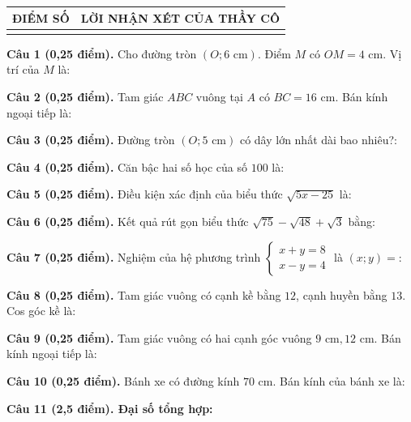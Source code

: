 \documentclass[12pt,a4paper]{article}
\begin{document}
\vspace{1.0mm}

\noindent
\begin{tabularx}{\linewidth}{|p{3.2cm}|X|}
\hline
\centering\textbf{ĐIỂM SỐ} & \centering\textbf{LỜI NHẬN XÉT CỦA THẦY CÔ} \tabularnewline
\hline
\rule{0pt}{1.8cm} & \tabularnewline
\hline
\end{tabularx}

\vspace{1.2mm}
\noindent\textbf{Câu 1 (0,25 điểm).} Cho đường tròn $(O; 6\text{ cm})$. Điểm $M$ có $OM = 4\text{ cm}$. Vị trí của $M$ là: \par\vspace{0.6mm}
\noindent\textbf{Câu 2 (0,25 điểm).} Tam giác $ABC$ vuông tại $A$ có $BC = 16\text{ cm}$. Bán kính ngoại tiếp là: \par\vspace{0.6mm}
\noindent\textbf{Câu 3 (0,25 điểm).} Đường tròn $(O; 5\text{ cm})$ có dây lớn nhất dài bao nhiêu?: \par\vspace{0.6mm}
\noindent\textbf{Câu 4 (0,25 điểm).} Căn bậc hai số học của số $100$ là: \par\vspace{0.6mm}
\noindent\textbf{Câu 5 (0,25 điểm).} Điều kiện xác định của biểu thức $\sqrt{5x - 25}$ là: \par\vspace{0.6mm}
\noindent\textbf{Câu 6 (0,25 điểm).} Kết quả rút gọn biểu thức $\sqrt{75} - \sqrt{48} + \sqrt{3}$ bằng: \par\vspace{0.6mm}
\noindent\textbf{Câu 7 (0,25 điểm).} Nghiệm của hệ phương trình $\begin{cases} x + y = 8 \\ x - y = 4 \end{cases}$ là $(x; y) = $: \par\vspace{0.6mm}
\noindent\textbf{Câu 8 (0,25 điểm).} Tam giác vuông có cạnh kề bằng $12$, cạnh huyền bằng $13$. Cos góc kề là: \par\vspace{0.6mm}
\noindent\textbf{Câu 9 (0,25 điểm).} Tam giác vuông có hai cạnh góc vuông $9\text{ cm}, 12\text{ cm}$. Bán kính ngoại tiếp là: \par\vspace{0.6mm}
\noindent\textbf{Câu 10 (0,25 điểm).} Bánh xe có đường kính $70\text{ cm}$. Bán kính của bánh xe là: \par\vspace{0.6mm}
\vspace{0.8mm}
\noindent\textbf{Câu 11 (2,5 điểm). Đại số tổng hợp:}
\vspace{0.6mm}
\end{document}
